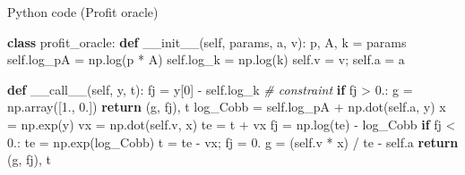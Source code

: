 \documentclass[10pt,ignorenonframetext,serif,onlymath]{beamer}
\newenvironment{Shaded}{}{}
\newcommand{\CommentTok}[1]{\textcolor[rgb]{0.38,0.63,0.69}{\textit{#1}}}
\newcommand{\ControlFlowTok}[1]{\textcolor[rgb]{0.00,0.44,0.13}{\textbf{#1}}}
\newcommand{\DecValTok}[1]{\textcolor[rgb]{0.25,0.63,0.44}{#1}}
\newcommand{\FloatTok}[1]{\textcolor[rgb]{0.25,0.63,0.44}{#1}}
\newcommand{\FunctionTok}[1]{\textcolor[rgb]{0.02,0.16,0.49}{#1}}
\newcommand{\KeywordTok}[1]{\textcolor[rgb]{0.00,0.44,0.13}{\textbf{#1}}}
\newcommand{\NormalTok}[1]{#1}
\newcommand{\OperatorTok}[1]{\textcolor[rgb]{0.40,0.40,0.40}{#1}}
\newcommand{\VariableTok}[1]{\textcolor[rgb]{0.10,0.09,0.49}{#1}}
\begin{document}
\begin{frame}{Python code (Profit oracle)}
\protect\hypertarget{python-code-profit-oracle}{}

\scriptsize

\begin{Shaded}
\begin{Highlighting}[]
\KeywordTok{class}\NormalTok{ profit_oracle:}
    \KeywordTok{def} \FunctionTok{__init__}\NormalTok{(}\VariableTok{self}\NormalTok{, params, a, v):}
\NormalTok{        p, A, k }\OperatorTok{=}\NormalTok{ params}
        \VariableTok{self}\NormalTok{.log_pA }\OperatorTok{=}\NormalTok{ np.log(p }\OperatorTok{*}\NormalTok{ A)}
        \VariableTok{self}\NormalTok{.log_k }\OperatorTok{=}\NormalTok{ np.log(k)}
        \VariableTok{self}\NormalTok{.v }\OperatorTok{=}\NormalTok{ v}\OperatorTok{;} \VariableTok{self}\NormalTok{.a }\OperatorTok{=}\NormalTok{ a}

    \KeywordTok{def} \FunctionTok{__call__}\NormalTok{(}\VariableTok{self}\NormalTok{, y, t):}
\NormalTok{        fj }\OperatorTok{=}\NormalTok{ y[}\DecValTok{0}\NormalTok{] }\OperatorTok{-} \VariableTok{self}\NormalTok{.log_k  }\CommentTok{# constraint}
        \ControlFlowTok{if}\NormalTok{ fj }\OperatorTok{>} \FloatTok{0.}\NormalTok{:}
\NormalTok{            g }\OperatorTok{=}\NormalTok{ np.array([}\FloatTok{1.}\NormalTok{, }\FloatTok{0.}\NormalTok{])}
            \ControlFlowTok{return}\NormalTok{ (g, fj), t}
\NormalTok{        log_Cobb }\OperatorTok{=} \VariableTok{self}\NormalTok{.log_pA }\OperatorTok{+}\NormalTok{ np.dot(}\VariableTok{self}\NormalTok{.a, y)}
\NormalTok{        x }\OperatorTok{=}\NormalTok{ np.exp(y)}
\NormalTok{        vx }\OperatorTok{=}\NormalTok{ np.dot(}\VariableTok{self}\NormalTok{.v, x)}
\NormalTok{        te }\OperatorTok{=}\NormalTok{ t }\OperatorTok{+}\NormalTok{ vx}
\NormalTok{        fj }\OperatorTok{=}\NormalTok{ np.log(te) }\OperatorTok{-}\NormalTok{ log_Cobb}
        \ControlFlowTok{if}\NormalTok{ fj }\OperatorTok{<} \FloatTok{0.}\NormalTok{:}
\NormalTok{            te }\OperatorTok{=}\NormalTok{ np.exp(log_Cobb)}
\NormalTok{            t }\OperatorTok{=}\NormalTok{ te }\OperatorTok{-}\NormalTok{ vx}\OperatorTok{;}\NormalTok{ fj }\OperatorTok{=} \FloatTok{0.}
\NormalTok{        g }\OperatorTok{=}\NormalTok{ (}\VariableTok{self}\NormalTok{.v }\OperatorTok{*}\NormalTok{ x) }\OperatorTok{/}\NormalTok{ te }\OperatorTok{-} \VariableTok{self}\NormalTok{.a}
        \ControlFlowTok{return}\NormalTok{ (g, fj), t}
\end{Highlighting}
\end{Shaded}

\end{frame}
\end{document}
